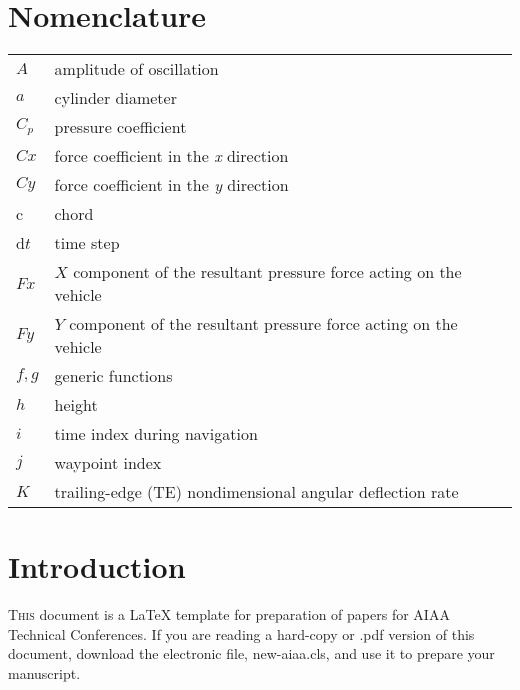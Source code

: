 \documentclass[conf]{new-aiaa}
\begin{document}

\tableofcontents

\newpage

\begin{abstract}
These instructions give you guidelines for preparing papers for AIAA Technical Papers using \LaTeX{}. Define all symbols used in the abstract. Do not cite references in the abstract. The footnote on the first page should list the Job Title and AIAA Member Grade for each author, if known Authors do not have to be AIAA members.
\end{abstract}

\section{Nomenclature}

{\renewcommand\arraystretch{1.0}
\noindent\begin{longtable*}{@{}l @{\quad=\quad} l@{}}
$A$  & amplitude of oscillation \\
$a$ &    cylinder diameter \\
$C_p$& pressure coefficient \\
$Cx$ & force coefficient in the \textit{x} direction \\
$Cy$ & force coefficient in the \textit{y} direction \\
c   & chord \\
d$t$ & time step \\
$Fx$ & $X$ component of the resultant pressure force acting on the vehicle \\
$Fy$ & $Y$ component of the resultant pressure force acting on the vehicle \\
$f, g$   & generic functions \\
$h$  & height \\
$i$  & time index during navigation \\
$j$  & waypoint index \\
$K$  & trailing-edge (TE) nondimensional angular deflection rate
\end{longtable*}}

\section{Introduction}
\lettrine{T}{his} document is a \LaTeX{} template for preparation of papers for AIAA Technical Conferences. If you are reading a hard-copy or .pdf version of this document, download the electronic file, new-aiaa.cls, and use it to prepare your manuscript.
\end{document}
